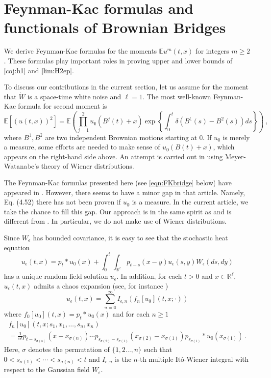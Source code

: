 \documentclass[12pt,reqno]{amsart}
\theoremstyle{remark}
\let\Section=\section
\def\section{\setcounter{equation}{0}\Section}
\newcommand{\1}{\mathbf{1}}
\def\RR{\mathbb{R}}
\def\EE{\mathbb{E}}
\def\lt{\left}
\def\rt{\right}
\begin{document}
\section{Feynman-Kac formulas and functionals of Brownian Bridges} %
\label{sub:feynman_kac_formula}
	We derive Feynman-Kac formulas for the moments $\EE u^m(t,x)$ for integers $m\ge2$. These formulas play important roles in proving upper and lower bounds of \eqref{coj:h1} and \eqref{lim:H2ep}.
	
	To discuss our contributions in the current section, let us assume for the moment that $\dot{W}$ is a space-time white noise and $\ell=1$. The most well-known Feynman-Kac formula for second moment is
	\begin{equation*}
		\EE [(u(t,x))^2]=\EE \left(\prod_{j=1}^2 u_0(B^j(t)+x)\exp\lt\{\int_0^t \delta(B^1(s)-B^2(s))ds \rt\}\right)\,,
	\end{equation*}
	where $B^1,B^2$ are two independent Brownian motions starting at 0.
	If $u_0$ is merely a measure, some efforts are needed to make sense of $u_0(B(t)+x)$, which appears on the right-hand side above. An attempt is carried out in \cite{ChenNualart2016} using Meyer-Watanabe's theory of Wiener distributions.

	The Feynman-Kac formulas presented here (see \eqref{eqn:FKbridge} below) have appeared in \cite{HLN15}. However, there seems to have a minor gap in that article. Namely, Eq. (4.52) there has not been proven if $u_0$ is a measure. In the current article, we take the chance to fill this gap. Our approach is in the same spirit as \cite{HLN15} and is different from \cite{ChenNualart2016}. In particular, we do not make use of Wiener distributions.


	Since $W_\epsilon$ has bounded covariance, it is easy to see that the stochastic heat equation
	\begin{equation}\label{eqn:SHEpsilon}
		u_ \epsilon(t,x)=p_t*u_0(x)+\int_0^t\int_{\RR^\ell}p_{t-s}(x-y)u_ \epsilon(s,y)W_ \epsilon(ds,dy)
	\end{equation}
	has a unique random field solution $u_ \epsilon$. In addition, for each $t>0$ and $x\in\RR^\ell$, $u_ \epsilon(t,x)$ admits a chaos expansion (see, for instance \cite{HuNu09})
	\begin{equation}\label{eqn:uep:chaos}
		u_ \epsilon(t,x)=\sum_{n=0}^\infty I_{\epsilon,n}(f_n[u_0](t,x;\cdot))
	\end{equation}
	where $f_0[u_0](t,x)=p_t*u_0(x)$ and for each $n\ge1$
	\begin{multline}\label{def:fn}
		f_n[u_0](t,x;s_1,x_1,\dots,s_n,x_n)
		\\=\frac1{n!}p_{t-s_{\sigma(n)}}(x- x_{\sigma(n)})\cdots p_{s_{\sigma(2)}-s_{\sigma(1)}}(x_{\sigma(2)}-x_{\sigma(1)})p_{s_{\sigma(1)}}*u_0(x_{\sigma(1)}) \,.
	\end{multline}
	Here, $\sigma$ denotes the permutation of $\{1,2\dots,n\}$ such that $0<s_{\sigma(1)}<\cdots<s_{\sigma(n)}<t$ and $I_{\epsilon,n}$ is the $n$-th multiple It\^o-Wiener integral with respect to the Gaussian field $W_ \epsilon$. %
\end{document}

